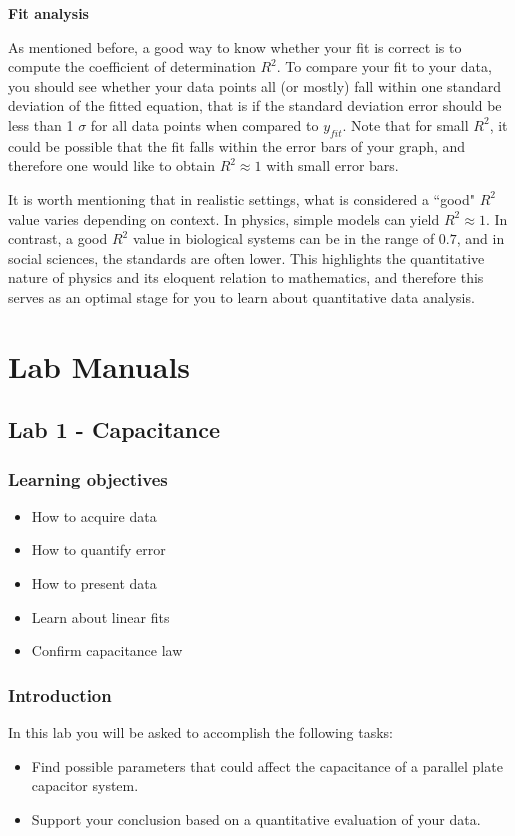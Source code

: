 \documentclass[12pt]{report}
\begin{document}
\noindent \large \textbf{Fit analysis} \normalsize

As mentioned before, a good way to know whether your fit is correct is to compute the coefficient of determination $R^2$. To compare your fit to your data, you should see whether your data points all (or mostly) fall within one standard deviation of the fitted equation, that is if the standard deviation error should be less than 1 $\sigma$ for all data points when compared to $y_{fit}$.
Note that for small $R^2$, it could be possible that the fit falls within the error bars of your graph, and therefore
one would like to obtain $R^2\approx 1$ with small error bars.

It is worth mentioning that in realistic settings, what is considered a ``good" $R^2$ value varies depending on context.
In physics, simple models can yield $R^2\approx 1$. 
In contrast, a good $R^2$ value in biological systems can be in the range of $0.7$,
and in social sciences, the standards are often lower.
This highlights the quantitative nature of physics and its eloquent relation to mathematics, and therefore
this serves as an optimal stage for you to learn about quantitative data analysis.	


\part{Lab Manuals} \label{Part:Labs}

\chapter{Lab 1 - Capacitance}
\section{Learning objectives}
\begin{itemize}
\item How to acquire data
\item How to quantify error
\item How to present data
\item Learn about linear fits
\item Confirm capacitance law
\end{itemize}


\section{Introduction}
In this lab you will be asked to accomplish the following tasks:
\begin{itemize}
\item Find possible parameters that could affect the capacitance of a parallel plate capacitor system.
\item Support your conclusion based on a quantitative evaluation of your data.
\end{itemize}
\end{document}
